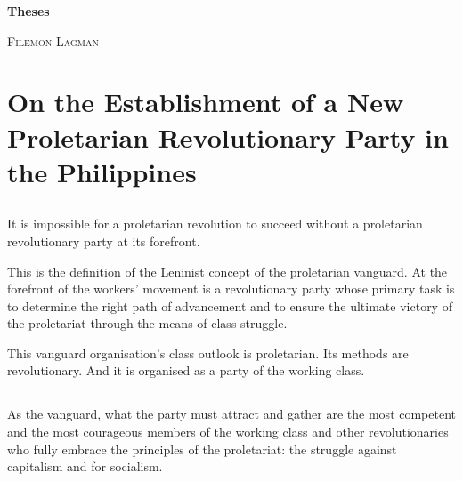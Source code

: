 \documentclass[a4paper,11pt,onesided]{report}
\begin{document}
\begin{titlepage}
    \begin{center}
        \vspace*{1cm}
 
        {\Huge  \textbf{Theses}}
 
        \vspace{0.5cm}
        {\textsc{Filemon Lagman}}
                   
        \vspace{1.5cm}
        
        {}

        \vspace{1.5cm}
        {}

        \vspace{0.5cm}
        {}

        \vspace{0.5cm}

        \vfill
    \end{center}
 \end{titlepage}

\tableofcontents




\chapter{On the Establishment 
of a New Proletarian Revolutionary Party 
in the Philippines}


\section{}
It is impossible for a proletarian revolution 
to succeed 
without a proletarian revolutionary party 
at its forefront.

This is the definition of the Leninist concept 
of the proletarian vanguard. 
At the forefront of the workers' movement 
is a revolutionary party 
whose primary task is 
to determine the right path of advancement 
and to ensure the ultimate victory 
of the proletariat 
through the means of class struggle.

This vanguard organisation's 
class outlook is proletarian. 
Its methods are revolutionary.
And it is organised as a party of the working class.


\section{}
As the vanguard, 
what the party must attract and gather
are the most competent and the most courageous members
of the working class and other revolutionaries
who fully embrace the principles of the proletariat:
the struggle against capitalism and for socialism.
\end{document}
